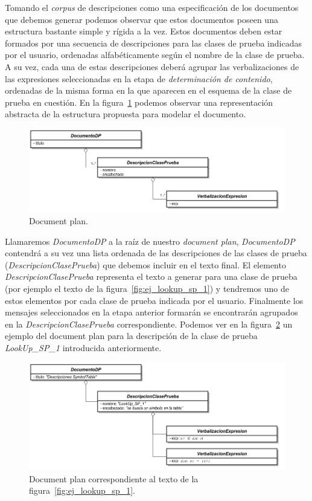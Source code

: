 Tomando el \emph{corpus} de descripciones como una especificación de los documentos que debemos generar podemos observar que estos documentos poseen una estructura bastante simple y rígida a la vez. Estos documentos deben estar formados por una secuencia de descripciones para las clases de prueba indicadas por el usuario, ordenadas alfabéticamente según el nombre de la clase de prueba. A su vez, cada una de estas descripciones deberá agrupar las verbalizaciones de las expresiones seleccionadas en la etapa de \emph{determinación de contenido}, ordenadas de la misma forma en la que aparecen en el esquema de la clase de prueba en cuestión. En la figura~\ref{fig:png_document_plan} podemos observar una representación abstracta de la estructura propuesta para modelar el documento.

\begin{figure}[H]
  	\centering
	\includegraphics[scale=0.4]{img/document_plan.png}
	\caption{Document plan.}
  	\label{fig:png_document_plan}
\end{figure}

Llamaremos \emph{DocumentoDP} a la raíz de nuestro \emph{document plan}, \emph{DocumentoDP} contendrá a su vez una lista ordenada de las descripciones de las clases de prueba (\emph{DescripcionClasePrueba}) que debemos incluir en el texto final. El elemento \emph{DescripcionClasePrueba} representa el texto a generar para una clase de prueba (por ejemplo el texto de la figura~\ref{fig:ej_lookup_sp_1}) y tendremos uno de estos elementos por cada clase de prueba indicada por el usuario. Finalmente los mensajes seleccionados en la etapa anterior formarán se encontrarán agrupados en la \emph{DescripcionClasePrueba} correspondiente. Podemos ver en la figura~\ref{fig:png_document_plan_ej} un ejemplo del document plan para la descripción de la clase de prueba \emph{LookUp\_SP\_1} introducida anteriormente. 

\begin{figure}[H]
  	\centering
	\includegraphics[scale=0.4]{img/document_plan_ej.png}
	\caption{Document plan correspondiente al texto de la figura~\ref{fig:ej_lookup_sp_1}.}
  	\label{fig:png_document_plan_ej}
\end{figure}


\label{sec:document_structure}